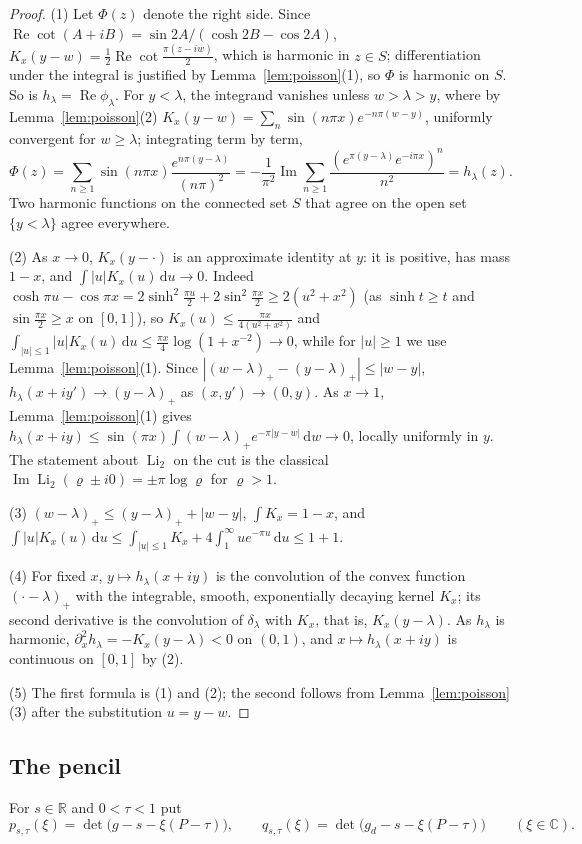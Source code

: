 \documentclass[11pt]{amsart}
\theoremstyle{definition}
\theoremstyle{remark}
\numberwithin{equation}{section}
\newcommand{\R}{\mathbb{R}}
\newcommand{\C}{\mathbb{C}}
\renewcommand{\Re}{\operatorname{Re}}
\renewcommand{\Im}{\operatorname{Im}}
\newcommand{\Li}{\operatorname{Li}_2}
\newcommand{\dd}{\,\mathrm{d}}
\begin{document}
\begin{proof}
(1) Let $\Phi(z)$ denote the right side. Since $\Re\cot(A+iB)=\sin2A/(\cosh2B-\cos2A)$,
$K_x(y-w)=\frac12\Re\cot\frac{\pi(z-iw)}2$, which is harmonic in $z\in S$; differentiation under the integral is
justified by Lemma~\ref{lem:poisson}(1), so $\Phi$ is harmonic on $S$. So is $h_\lambda=\Re\phi_\lambda$. For $y<\lambda$,
the integrand vanishes unless $w>\lambda>y$, where by Lemma~\ref{lem:poisson}(2)
$K_x(y-w)=\sum_n\sin(n\pi x)e^{-n\pi(w-y)}$, uniformly convergent for $w\ge\lambda$; integrating term by term,
\[
\Phi(z)=\sum_{n\ge1}\sin(n\pi x)\frac{e^{n\pi(y-\lambda)}}{(n\pi)^2}
=-\frac1{\pi^2}\Im\sum_{n\ge1}\frac{(e^{\pi(y-\lambda)}e^{-i\pi x})^n}{n^2}=h_\lambda(z).
\]
Two harmonic functions on the connected set $S$ that agree on the open set $\{y<\lambda\}$ agree everywhere.

(2) As $x\to0$, $K_x(y-\cdot)$ is an approximate identity at $y$: it is positive, has mass $1-x$, and
$\int|u|K_x(u)\dd u\to0$. Indeed $\cosh\pi u-\cos\pi x=2\sinh^2\frac{\pi u}2+2\sin^2\frac{\pi x}2\ge2(u^2+x^2)$ (as
$\sinh t\ge t$ and $\sin\frac{\pi x}2\ge x$ on $[0,1]$), so $K_x(u)\le\frac{\pi x}{4(u^2+x^2)}$ and
$\int_{|u|\le1}|u|K_x(u)\dd u\le\frac{\pi x}4\log(1+x^{-2})\to0$, while for $|u|\ge1$ we use Lemma~\ref{lem:poisson}(1). Since $|(w-\lambda)_+-(y-\lambda)_+|\le|w-y|$, $h_\lambda(x+iy')\to(y-\lambda)_+$ as
$(x,y')\to(0,y)$. As $x\to1$, Lemma~\ref{lem:poisson}(1) gives $h_\lambda(x+iy)\le\sin(\pi x)\int(w-\lambda)_+e^{-\pi|y-w|}\dd w\to0$,
locally uniformly in $y$. The statement about $\Li$ on the cut is the classical
$\Im\Li(\varrho\pm i0)=\pm\pi\log\varrho$ for $\varrho>1$.

(3) $(w-\lambda)_+\le(y-\lambda)_++|w-y|$, $\int K_x=1-x$, and
$\int|u|K_x(u)\dd u\le\int_{|u|\le1}K_x+4\int_1^\infty ue^{-\pi u}\dd u\le1+1$.

(4) For fixed $x$, $y\mapsto h_\lambda(x+iy)$ is the convolution of the convex function $(\cdot-\lambda)_+$ with the
integrable, smooth, exponentially decaying kernel $K_x$; its second derivative is the convolution of
$\delta_\lambda$ with $K_x$, that is, $K_x(y-\lambda)$. As $h_\lambda$ is harmonic, $\partial_x^2h_\lambda=-K_x(y-\lambda)<0$ on
$(0,1)$, and $x\mapsto h_\lambda(x+iy)$ is continuous on $[0,1]$ by (2).

(5) The first formula is (1) and (2); the second follows from Lemma~\ref{lem:poisson}(3) after the substitution
$u=y-w$.
\end{proof}

\subsection{The pencil}
For $s\in\R$ and $0<\tau<1$ put
\[
p_{s,\tau}(\xi)=\det\bigl(g-s-\xi(P-\tau)\bigr),\qquad q_{s,\tau}(\xi)=\det\bigl(g_d-s-\xi(P-\tau)\bigr)\qquad(\xi\in\C).
\]
\end{document}

